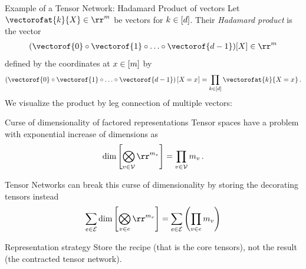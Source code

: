 \documentclass{beamer}
\begin{document}
    \begin{frame}{Example of a Tensor Network: Hadamard Product of vectors}
        Let $\vectorofat{\catenumerator}{\catvariable}\in\rr^{\catdim}$ be vectors for $k\in[d]$.
        Their \emph{Hadamard product} is the vector
        \begin{align*}
            (\vectorof{0}\circ\vectorof{1}\circ \ldots \circ \vectorof{\atomorder-1})[\catvariable] \in \rr^m
        \end{align*}
        defined by the coordinates at $x\in[m]$ by
        \begin{align*}
            \left(\vectorof{0}\circ\vectorof{1} \circ \ldots \circ \vectorof{\atomorder-1} \right)\left[\indexedcatvariable\right]
            = \prod_{\atomenumeratorin} \vectorofat{\catenumerator}{\indexedcatvariable} \, .
        \end{align*}
        We visualize the product by leg connection of multiple vectors:
        \begin{center}
            
        \end{center}
    \end{frame}

    \begin{frame}{Curse of dimensionality of factored representations}
        Tensor spaces have a problem with exponential increase of dimensions as
        \[ \mathrm{dim}\left[
                           \bigotimes_{\node\in\nodes} \rr^{\catdimof{\node}}
        \right] =
        \prod_{\node\in\nodes} \catdimof{\node} \, . \]

        Tensor Networks can break this curse of dimensionality by storing the decorating tensors instead
        \begin{align*}
            \sum_{\edge\in\edges} \mathrm{dim}\left[  \bigotimes_{\node\in\edge} \rr^{\catdimof{\node}} \right]
            =    \sum_{\edge\in\edges}  \left(\prod_{\node\in\edge} \catdimof{\node}\right)
        \end{align*}

        \begin{block}{Representation strategy}
            Store the recipe (that is the core tensors), not the result (the contracted tensor network).
        \end{block}
    \end{frame}
\end{document}
